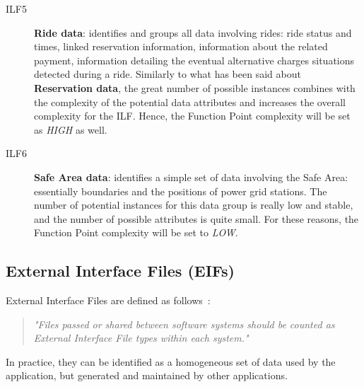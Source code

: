 \begin{description}
\item[ILF5] \textbf{Ride data}: identifies and groups all data involving rides: ride status and times, linked reservation information, information about the related payment, information detailing the eventual alternative charges situations detected during a ride. Similarly to what has been said about \textbf{Reservation data}, the great number of possible instances combines with the complexity of the potential data attributes and increases the overall complexity for the ILF. Hence, the Function Point complexity will be set as \textit{HIGH} as well.
\item[ILF6] \textbf{Safe Area data}: identifies a simple set of data involving the Safe Area: essentially boundaries and the positions of power grid stations. The number of potential instances for this data group is really low and stable, and the number of possible attributes is quite small. For these reasons, the Function Point complexity will be set to \textit{LOW}.
\end{description}

\subsection{External Interface Files (EIFs)}
External Interface Files are defined as follows~\cite{cocomo-manual}:
\begin{quotation}
\textit{"Files passed or shared between software systems should be counted as External Interface File types within each system."}
\end{quotation}
In practice, they can be identified as a homogeneous set of data used by the application, but generated and maintained by other applications.

